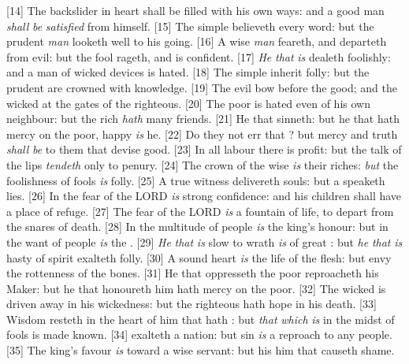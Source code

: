[14] \textcolor[cmyk]{0.99998,1,0,0}{The backslider in heart shall be filled with his own ways: and a good man \emph{shall} \emph{be} \emph{satisfied} from himself.}
[15] \textcolor[cmyk]{0.99998,1,0,0}{The simple believeth every word: but the prudent \emph{man} looketh well to his going.}
[16] \textcolor[cmyk]{0.99998,1,0,0}{A wise \emph{man} feareth, and departeth from evil: but the fool rageth, and is confident.}
[17] \textcolor[cmyk]{0.99998,1,0,0}{\emph{He} \emph{that} \emph{is}  dealeth foolishly: and a man of wicked devices is hated.}
[18] \textcolor[cmyk]{0.99998,1,0,0}{The simple inherit folly: but the prudent are crowned with knowledge.}
[19] \textcolor[cmyk]{0.99998,1,0,0}{The evil bow before the good; and the wicked at the gates of the righteous.}
[20] \textcolor[cmyk]{0.99998,1,0,0}{The poor is hated even of his own neighbour: but the rich \emph{hath} many friends.}
[21] \textcolor[cmyk]{0.99998,1,0,0}{He that  sinneth: but he that hath mercy on the poor, happy \emph{is} he.}
[22] \textcolor[cmyk]{0.99998,1,0,0}{Do they not err that ? but mercy and truth \emph{shall} \emph{be} to them that devise good.}
[23] \textcolor[cmyk]{0.99998,1,0,0}{In all labour there is profit: but the talk of the lips \emph{tendeth} only to penury.}
[24] \textcolor[cmyk]{0.99998,1,0,0}{The crown of the wise \emph{is} their riches: \emph{but} the foolishness of fools \emph{is} folly.}
[25] \textcolor[cmyk]{0.99998,1,0,0}{A true witness delivereth souls: but a  speaketh lies.}
[26] \textcolor[cmyk]{0.99998,1,0,0}{In the fear of the LORD \emph{is} strong confidence: and his children shall have a place of refuge.}
[27] \textcolor[cmyk]{0.99998,1,0,0}{The fear of the LORD \emph{is} a fountain of life, to depart from the snares of death.}
[28] \textcolor[cmyk]{0.99998,1,0,0}{In the multitude of people \emph{is} the king's honour: but in the want of people \emph{is} the .}
[29] \textcolor[cmyk]{0.99998,1,0,0}{\emph{He} \emph{that} \emph{is} slow to wrath \emph{is} of great : but \emph{he} \emph{that} \emph{is} hasty of spirit exalteth folly.}
[30] \textcolor[cmyk]{0.99998,1,0,0}{A sound heart \emph{is} the life of the flesh: but envy the rottenness of the bones.}
[31] \textcolor[cmyk]{0.99998,1,0,0}{He that oppresseth the poor reproacheth his Maker: but he that honoureth him hath mercy on the poor.}
[32] \textcolor[cmyk]{0.99998,1,0,0}{The wicked is driven away in his wickedness: but the righteous hath hope in his death.}
[33] \textcolor[cmyk]{0.99998,1,0,0}{Wisdom resteth in the heart of him that hath : but \emph{that} \emph{which} \emph{is} in the midst of fools is made known.}
[34] \textcolor[cmyk]{0.99998,1,0,0}{ exalteth a nation: but sin \emph{is} a reproach to any people.}
[35] \textcolor[cmyk]{0.99998,1,0,0}{The king's favour \emph{is} toward a wise servant: but his  him that causeth shame.}


